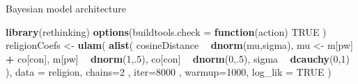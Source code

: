 \documentclass[10pt,ignorenonframetext,x11names, dvipsnames, bibspacing,natbib]{beamer}
\newenvironment{Shaded}{\begin{snugshade}}{\end{snugshade}}
\newcommand{\KeywordTok}[1]{\textcolor[rgb]{0.13,0.29,0.53}{\textbf{#1}}}
\newcommand{\DataTypeTok}[1]{\textcolor[rgb]{0.13,0.29,0.53}{#1}}
\newcommand{\DecValTok}[1]{\textcolor[rgb]{0.00,0.00,0.81}{#1}}
\newcommand{\StringTok}[1]{\textcolor[rgb]{0.31,0.60,0.02}{#1}}
\newcommand{\OtherTok}[1]{\textcolor[rgb]{0.56,0.35,0.01}{#1}}
\newcommand{\ControlFlowTok}[1]{\textcolor[rgb]{0.13,0.29,0.53}{\textbf{#1}}}
\newcommand{\OperatorTok}[1]{\textcolor[rgb]{0.81,0.36,0.00}{\textbf{#1}}}
\newcommand{\NormalTok}[1]{#1}
\begin{document}
\begin{frame}[fragile]{Bayesian model architecture}

\vspace{1mm} \footnotesize

\begin{Shaded}
\begin{Highlighting}[]
\KeywordTok{library}\NormalTok{(rethinking)}
\KeywordTok{options}\NormalTok{(}\DataTypeTok{buildtools.check =} \ControlFlowTok{function}\NormalTok{(action) }\OtherTok{TRUE}\NormalTok{ )}
\NormalTok{religionCoefs <-}\StringTok{ }\KeywordTok{ulam}\NormalTok{(}
  \KeywordTok{alist}\NormalTok{(}
\NormalTok{    cosineDistance }\OperatorTok{~}\StringTok{ }\KeywordTok{dnorm}\NormalTok{(mu,sigma),}
\NormalTok{    mu <-}\StringTok{ }\NormalTok{m[pw] }\OperatorTok{+}\StringTok{ }\NormalTok{co[con],}
\NormalTok{    m[pw] }\OperatorTok{~}\StringTok{ }\KeywordTok{dnorm}\NormalTok{(}\DecValTok{1}\NormalTok{,.}\DecValTok{5}\NormalTok{),}
\NormalTok{    co[con] }\OperatorTok{~}\StringTok{ }\KeywordTok{dnorm}\NormalTok{(}\DecValTok{0}\NormalTok{,.}\DecValTok{5}\NormalTok{),}
\NormalTok{    sigma }\OperatorTok{~}\StringTok{ }\KeywordTok{dcauchy}\NormalTok{(}\DecValTok{0}\NormalTok{,}\DecValTok{1}\NormalTok{)}
\NormalTok{  ),}
  \DataTypeTok{data =}\NormalTok{ religion,}
  \DataTypeTok{chains=}\DecValTok{2}\NormalTok{ , }\DataTypeTok{iter=}\DecValTok{8000}\NormalTok{ , }\DataTypeTok{warmup=}\DecValTok{1000}\NormalTok{, }
  \DataTypeTok{log_lik =} \OtherTok{TRUE}
\NormalTok{)}
\end{Highlighting}
\end{Shaded}

\normalsize

\end{frame}
\end{document}
